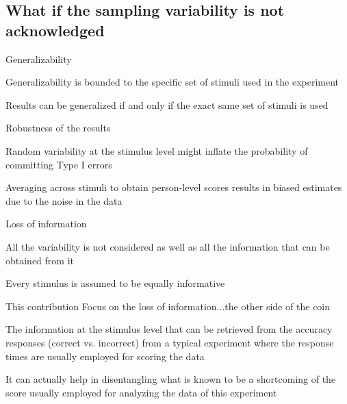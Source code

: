 \documentclass[compress]{beamer}
\begin{document}
\subsection{What if the sampling variability is not acknowledged}

\begin{frame}{}
	
	
	\begin{block}{Generalizability}
	
	\small
	
	Generalizability is bounded to the specific set of stimuli used in the experiment
	 
	 Results can be generalized if and only if the exact same set of stimuli is used 
	

	\end{block}
	
	\pause
 
	\begin{block}{Robustness of the results}
		
		\small
		Random variability at the stimulus level might inflate the probability of committing Type I errors
		
		Averaging across stimuli to obtain person-level scores results in biased estimates due to the noise in the data
	\end{block}
	
	\pause
	
	\begin{block}{Loss of information}
		
		\small
	
		All the variability is not considered as well as all the information that can be obtained from it 
		
			Every stimulus is assumed to be equally informative
	\end{block}
	
\end{frame}

\begin{frame}{This contribution}
	Focus on the loss of information...the other side of the coin 
	
	\vspace{2.5mm}
	\pause
	The information at the stimulus level that can be retrieved from the accuracy responses (correct vs. incorrect) from a typical experiment where the response times are usually employed for scoring the data
	
	\vspace{2.5mm}
	\pause 
	It can actually help in disentangling what is known to be a shortcoming of the score usually employed for analyzing the data of this experiment
\end{frame}
\end{document}
